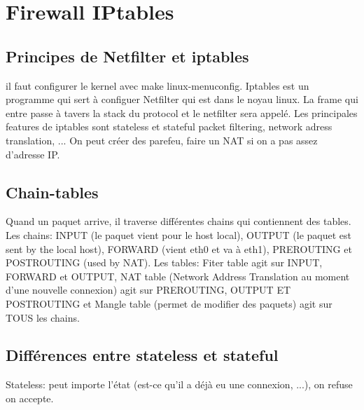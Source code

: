 \section{Firewall IPtables}
\subsection{Principes de Netfilter et iptables}
il faut configurer le kernel avec make linux-menuconfig. Iptables est un programme qui sert à configuer Netfilter qui est dans le noyau linux. La frame qui entre passe à tavers la stack du protocol et le netfilter sera appelé. Les principales features de iptables sont stateless et stateful packet filtering, network adress translation, ... On peut créer des parefeu, faire un NAT si on a pas assez d'adresse IP.
\subsection{Chain-tables}
Quand un paquet arrive, il traverse différentes chains qui contiennent des tables. Les chains: INPUT (le paquet vient pour le host local), OUTPUT (le paquet est sent by the local host), FORWARD (vient eth0 et va à eth1), PREROUTING et POSTROUTING (used by NAT). Les tables: Fiter table agit sur INPUT, FORWARD et OUTPUT, NAT table (Network Address Translation au moment d'une nouvelle connexion) agit sur PREROUTING, OUTPUT ET POSTROUTING et Mangle table (permet de modifier des paquets) agit sur TOUS les chains.
\subsection{Différences entre stateless et stateful}
Stateless: peut importe l'état (est-ce qu'il a déjà eu une connexion, ...), on refuse on accepte.

